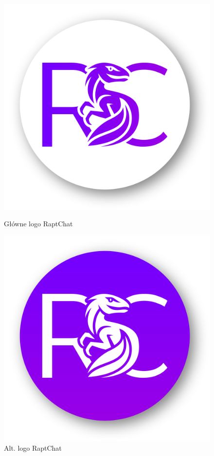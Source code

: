 \vspace{1cm}
\begin{figure}[H]
    \centering
    \begin{minipage}[b]{0.45\textwidth}
        \centering
        \includegraphics[width=\textwidth]{root/app_logo_1.png}
        \caption{Główne logo RaptChat}
    \end{minipage}
    \hfill
    \begin{minipage}[b]{0.45\textwidth}
        \centering
        \includegraphics[width=\textwidth]{root/app_logo_2.png}
        \caption{Alt. logo RaptChat}
    \end{minipage}
\end{figure}


